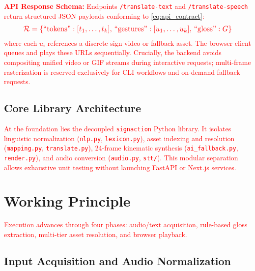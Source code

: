 \documentclass[conference,a4paper,10pt]{IEEEtran}
\begin{document}
\textcolor{red}{\textbf{API Response Schema:} Endpoints \texttt{/translate-text} and \texttt{/translate-speech} return structured JSON payloads conforming to \eqref{eq:api_contract}:}
\begin{equation}
\resizebox{0.88\columnwidth}{!}{$\displaystyle
\textcolor{red}{\mathcal{R} = \{\text{``tokens''}: [t_1, \ldots, t_k],\, \text{``gestures''}: [u_1, \ldots, u_k],\, \text{``gloss''}: G\}}
$}
\label{eq:api_contract}
\end{equation}
\textcolor{red}{where each $u_i$ references a discrete sign video or fallback asset. The browser client queues and plays these URLs sequentially. Crucially, the backend avoids compositing unified video or GIF streams during interactive requests; multi-frame rasterization is reserved exclusively for CLI workflows and on-demand fallback requests.}

\subsection{Core Library Architecture}

\textcolor{red}{At the foundation lies the decoupled \texttt{signaction} Python library. It isolates linguistic normalization (\texttt{nlp.py}, \texttt{lexicon.py}), asset indexing and resolution (\texttt{mapping.py}, \texttt{translate.py}), 24-frame kinematic synthesis (\texttt{ai\_fallback.py}, \texttt{render.py}), and audio conversion (\texttt{audio.py}, \texttt{stt/}). This modular separation allows exhaustive unit testing without launching FastAPI or Next.js services.}

\section{Working Principle}
\label{sec:method}

\textcolor{red}{Execution advances through four phases: audio/text acquisition, rule-based gloss extraction, multi-tier asset resolution, and browser playback.}

\subsection{Input Acquisition and Audio Normalization}
\end{document}
